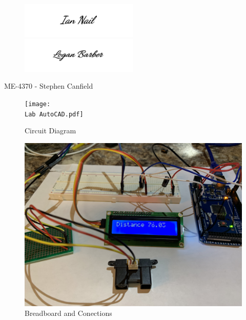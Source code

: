 \documentclass[a4paper,12pt]{article} %
\begin{document}
\maketitle %
\vspace{3cm}

\begin{figure}[h!]
\centering
    \includegraphics[width=0.5\textwidth]{IANsignature.png}
    \includegraphics[width=0.5\textwidth]{LOGANsignature.png}
  \end{figure}
\begin{center}
\vspace{3cm}
ME-4370 - Stephen Canfield
\end{center}
\pagebreak


\pagebreak

\pagebreak
\begin{figure}[h!]
  \center
  \texttt{[image: \\Lab AutoCAD.pdf]}
  \caption{Circuit Diagram}
\end{figure}
\pagebreak
\begin{figure}[h!]
  \center
  \includegraphics[width=1.1\textwidth]{ConnectionsImage.JPG}
  \caption{Breadboard and Conections}
\end{figure}
\pagebreak
\end{document}
